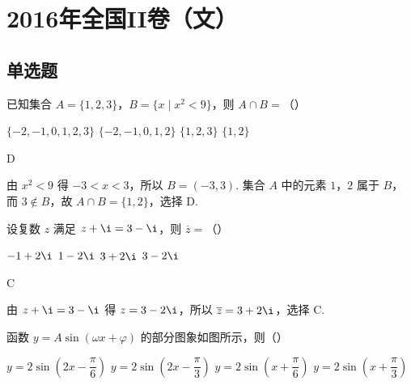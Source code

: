 

\chapter{2016年全国II卷（文）}

\section{单选题}

\begin{problem}
已知集合 \(A=\{1,2,3\}\)，\(B=\{x\mid x^2<9\}\)，则 \(A\cap B=\)（\quad）

\choices
    {\(\{-2,-1,0,1,2,3\}\)}
    {\(\{-2,-1,0,1,2\}\)}
    {\(\{1,2,3\}\)}
    {\(\{1,2\}\)}
\end{problem}

\begin{answer}
D
\end{answer}

\begin{solution}
由 \(x^2<9\) 得 \(-3<x<3\)，所以 \(B=(-3,3)\). 集合 \(A\) 中的元素 \(1\)，\(2\) 属于 \(B\)，而 \(3\notin B\)，故 \(A\cap B=\{1,2\}\)，选择 D.
\end{solution}

\begin{problem}
设复数 \(z\) 满足 \(z+\i=3-\i\)，则 \(\overline z=\)（\quad）

\choices
    {\(-1+2\i\)}
    {\(1-2\i\)}
    {\(3+2\i\)}
    {\(3-2\i\)}
\end{problem}

\begin{answer}
C
\end{answer}

\begin{solution}
由 \(z+\i=3-\i\) 得 \(z=3-2\i\)，所以 \(\overline z=3+2\i\)，选择 C.
\end{solution}


\begin{problem}
函数 \(y=A\sin(\omega x+\varphi)\) 的部分图象如图所示，则（\quad）

\begingroup
{}
\endgroup

\choices
    {\(y=2\sin\left(2x-\dfrac{\pi}{6}\right)\)}
    {\(y=2\sin\left(2x-\dfrac{\pi}{3}\right)\)}
    {\(y=2\sin\left(x+\dfrac{\pi}{6}\right)\)}
    {\(y=2\sin\left(x+\dfrac{\pi}{3}\right)\)}
\end{problem}


